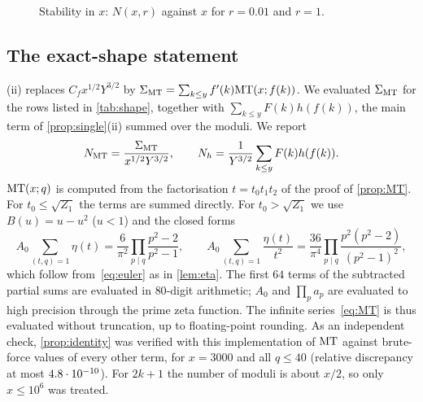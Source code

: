 \begin{figure}[htbp]
\centering
{}
\caption{Stability in $x$: $N(x,r)$ against $x$ for $r=0.01$ and $r=1$.}
\label{fig:x}
\end{figure}

\subsection{The exact-shape statement}\label{sec:num-shape}

(ii) replaces $C_fx^{1/2}Y^{3/2}$ by $\Sigma_{\mathrm{MT}}=\sum_{k\le y}f'(k)\mathrm{MT}(x;f(k))$. We evaluated $\Sigma_{\mathrm{MT}}$ for the rows listed in \cref{tab:shape}, together with $\sum_{k\le y}F(k)h(f(k))$, the main term of \cref{prop:single}(ii) summed over the moduli. We report
\[
N_{\mathrm{MT}}=\frac{\Sigma_{\mathrm{MT}}}{x^{1/2}Y^{3/2}},\qquad N_h=\frac{1}{Y^{3/2}}\sum_{k\le y}F(k)h(f(k)).
\]
$\mathrm{MT}(x;q)$ is computed from the factorisation $t=t_0t_1t_2$ of the proof of \cref{prop:MT}. For $t_0\le\sqrt{Z_1}$ the terms are summed directly. For $t_0>\sqrt{Z_1}$ we use $B(u)=u-u^2$ ($u<1$) and the closed forms
\[
A_0\sum_{(t,q)=1}\eta(t)=\frac6{\pi^2}\prod_{p\mid q}\frac{p^2-2}{p^2-1},\qquad A_0\sum_{(t,q)=1}\frac{\eta(t)}{t^2}=\frac{36}{\pi^4}\prod_{p\mid q}\frac{p^2(p^2-2)}{(p^2-1)^2},
\]
which follow from~\eqref{eq:euler} as in \cref{lem:eta}. The first $64$ terms of the subtracted partial sums are evaluated in $80$-digit arithmetic; $A_0$ and $\prod_pa_p$ are evaluated to high precision through the prime zeta function. The infinite series~\eqref{eq:MT} is thus evaluated without truncation, up to floating-point rounding. As an independent check, \cref{prop:identity} was verified with this implementation of $\mathrm{MT}$ against brute-force values of every other term, for $x=3000$ and all $q\le40$ (relative discrepancy at most $4.8\cdot 10^{-10}$). For $2k+1$ the number of moduli is about $x/2$, so only $x\le10^6$ was treated.

